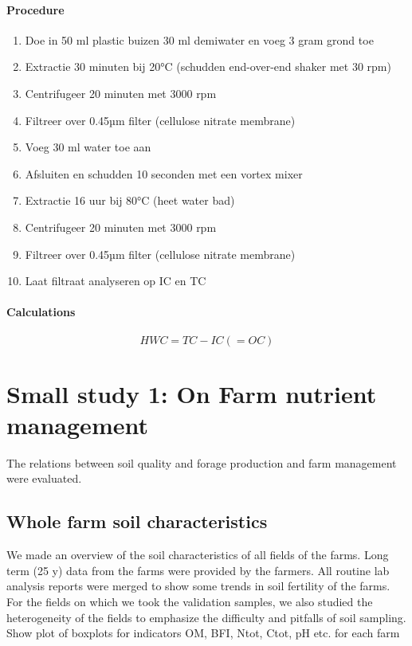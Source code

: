 \documentclass[10pt,twoside,dutch,english]{report}
\begin{document}
\begin{appendices}
\subsubsection{Procedure}
\begin{enumerate}
\item Doe in 50 ml plastic buizen 30 ml demiwater en voeg 3 gram grond toe
\item Extractie 30 minuten bij 20°C (schudden end-over-end shaker met 30 rpm)
\item Centrifugeer 20 minuten met 3000 rpm
\item Filtreer over 0.45µm filter (cellulose nitrate membrane)
\item Voeg 30 ml water toe aan
\item Afsluiten en schudden 10 seconden met een vortex mixer
\item Extractie 16 uur bij 80°C (heet water bad)
\item Centrifugeer 20 minuten met 3000 rpm
\item Filtreer over 0.45µm filter (cellulose nitrate membrane)
\item Laat filtraat analyseren op IC en TC
\end{enumerate}



\subsubsection{Calculations}
\begin{equation} HWC= TC-IC (=OC)
\end{equation}

\chapter{Small study 1: On Farm nutrient management}
		\label{chap: study1}
		The relations between soil quality and forage production and farm management were evaluated. 
			\section{Whole farm soil characteristics}
	We made an overview of the soil characteristics of all fields of the farms. Long term (25 y) data from the farms were provided by the farmers. All routine lab analysis reports were merged to show some trends in  soil fertility of the farms. For the fields on which we took the validation samples, we also studied the heterogeneity of the fields to emphasize the difficulty and pitfalls of soil sampling. 
	Show plot of boxplots for indicators OM, BFI, Ntot, Ctot, pH etc. for each farm
	

\end{appendices}
\end{document}
